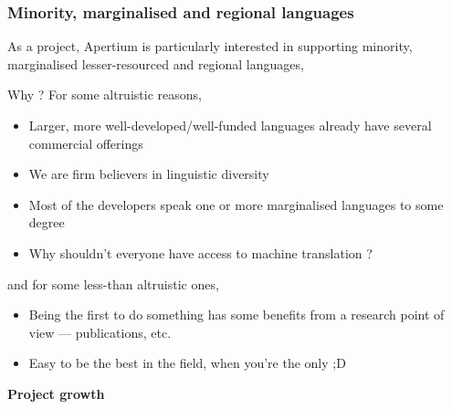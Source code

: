 \documentclass[10pt,xetex]{beamer} %
\begin{document}
\begin{frame}
  \frametitle{Minority, marginalised and regional languages}

As a project, Apertium is particularly interested in supporting minority, marginalised
lesser-resourced and regional languages,

Why ?  For some altruistic reasons, 

  \begin{itemize}
    \item Larger, more well-developed/well-funded languages already have several commercial offerings 
    \item We are firm believers in linguistic diversity
    \item Most of the developers speak one or more marginalised languages to some degree
    \item Why shouldn't everyone have access to machine translation ?
  \end{itemize}

and for some less-than altruistic ones,

  \begin{itemize}
    \item Being the first to do something has some benefits from a research point of view --- publications, etc.
    \item Easy to be the best in the field, when you're the only ;D
  \end{itemize}

\end{frame}


\begin{frame} %
 \begin{center}
 {\Large {\bf Project growth}}
 \end{center}
\end{frame}
\end{document}
